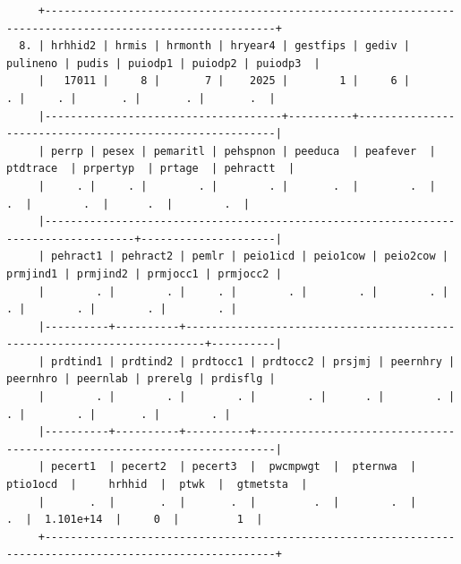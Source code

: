 \documentclass[
]{book}
\begin{document}
\begin{verbatim}
     +----------------------------------------------------------------------------------------------------------+
  8. | hrhhid2 | hrmis | hrmonth | hryear4 | gestfips | gediv | pulineno | pudis | puiodp1 | puiodp2 | puiodp3  |
     |   17011 |     8 |       7 |    2025 |        1 |     6 |        . |     . |       . |       . |       .  |
     |-------------------------------------+----------+---------------------------------------------------------|
     | perrp | pesex | pemaritl | pehspnon | peeduca  | peafever  | ptdtrace  | prpertyp  | prtage  | pehractt  |
     |     . |     . |        . |        . |       .  |        .  |        .  |        .  |      .  |        .  |
     |------------------------------------------------------------------------------------+---------------------|
     | pehract1 | pehract2 | pemlr | peio1icd | peio1cow | peio2cow | prmjind1 | prmjind2 | prmjocc1 | prmjocc2 |
     |        . |        . |     . |        . |        . |        . |        . |        . |        . |        . |
     |----------+----------+-------------------------------------------------------------------------+----------|
     | prdtind1 | prdtind2 | prdtocc1 | prdtocc2 | prsjmj | peernhry | peernhro | peernlab | prerelg | prdisflg |
     |        . |        . |        . |        . |      . |        . |        . |        . |       . |        . |
     |----------+----------+----------+-------------------------------------------------------------------------|
     | pecert1  | pecert2  | pecert3  |  pwcmpwgt  |  pternwa  |  ptio1ocd  |     hrhhid  |  ptwk  |  gtmetsta  |
     |       .  |       .  |       .  |         .  |        .  |         .  |  1.101e+14  |     0  |         1  |
     +----------------------------------------------------------------------------------------------------------+


\end{verbatim}
\end{document}
